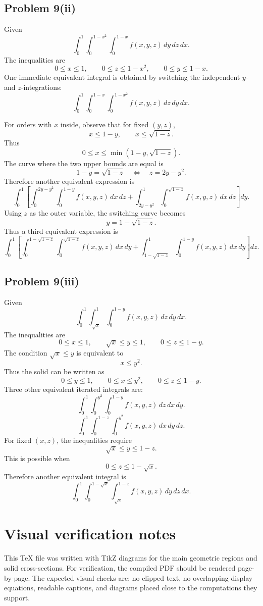 \documentclass[11pt,a4paper]{article}
\begin{document}
\subsection{Problem 9(ii)}
Given
\[
 \int_0^1\int_0^{1-x^2}\int_0^{1-x}f(x,y,z)\,dy\,dz\,dx.
\]
The inequalities are
\[
 0\le x\le1,
\qquad 0\le z\le1-x^2,
\qquad 0\le y\le1-x.
\]
One immediate equivalent integral is obtained by switching the independent \(y\)- and \(z\)-integrations:
\[
\boxed{\int_0^1\int_0^{1-x}\int_0^{1-x^2}f(x,y,z)\,dz\,dy\,dx.}
\]

For orders with \(x\) inside, observe that for fixed \((y,z)\),
\[
 x\le1-y,
\qquad x\le\sqrt{1-z}.
\]
Thus
\[
 0\le x\le\min(1-y,\sqrt{1-z}).
\]
The curve where the two upper bounds are equal is
\[
 1-y=\sqrt{1-z}
\quad\Longleftrightarrow\quad
 z=2y-y^2.
\]
Therefore another equivalent expression is
\[
\boxed{\int_0^1\left[
\int_0^{2y-y^2}\int_0^{1-y}f(x,y,z)\,dx\,dz
+\int_{2y-y^2}^{1}\int_0^{\sqrt{1-z}}f(x,y,z)\,dx\,dz
\right]dy.}
\]
Using \(z\) as the outer variable, the switching curve becomes
\[
 y=1-\sqrt{1-z}.
\]
Thus a third equivalent expression is
\[
\boxed{\int_0^1\left[
\int_0^{1-\sqrt{1-z}}\int_0^{\sqrt{1-z}}f(x,y,z)\,dx\,dy
+\int_{1-\sqrt{1-z}}^1\int_0^{1-y}f(x,y,z)\,dx\,dy
\right]dz.}
\]

\subsection{Problem 9(iii)}
Given
\[
 \int_0^1\int_{\sqrt{x}}^1\int_0^{1-y}f(x,y,z)\,dz\,dy\,dx.
\]
The inequalities are
\[
 0\le x\le1,
\qquad \sqrt{x}\le y\le1,
\qquad 0\le z\le1-y.
\]
The condition \(\sqrt{x}\le y\) is equivalent to
\[
 x\le y^2.
\]
Thus the solid can be written as
\[
 0\le y\le1,
\qquad 0\le x\le y^2,
\qquad 0\le z\le1-y.
\]
Three other equivalent iterated integrals are:
\[
\boxed{\int_0^1\int_0^{y^2}\int_0^{1-y}f(x,y,z)\,dz\,dx\,dy.}
\]
\[
\boxed{\int_0^1\int_0^{1-z}\int_0^{y^2}f(x,y,z)\,dx\,dy\,dz.}
\]
For fixed \((x,z)\), the inequalities require
\[
 \sqrt{x}\le y\le1-z.
\]
This is possible when
\[
 0\le z\le1-\sqrt{x}.
\]
Therefore another equivalent integral is
\[
\boxed{\int_0^1\int_0^{1-\sqrt{x}}\int_{\sqrt{x}}^{1-z}f(x,y,z)\,dy\,dz\,dx.}
\]

\section*{Visual verification notes}
This TeX file was written with TikZ diagrams for the main geometric regions and solid cross-sections.  For verification, the compiled PDF should be rendered page-by-page.  The expected visual checks are: no clipped text, no overlapping display equations, readable captions, and diagrams placed close to the computations they support.
\end{document}
